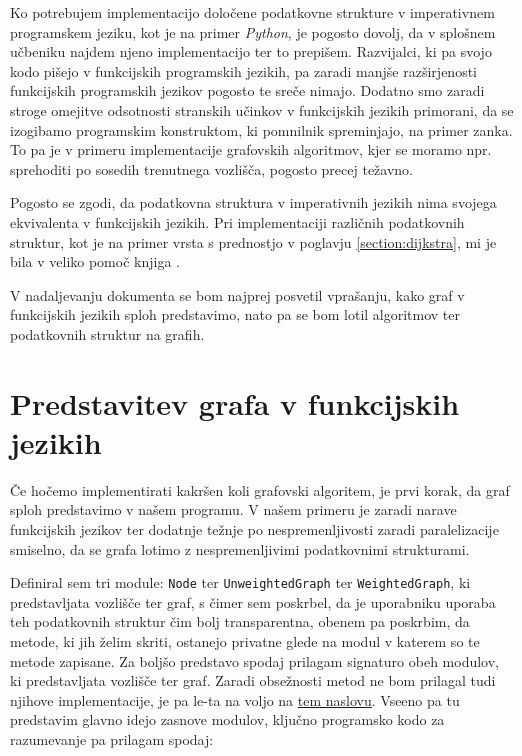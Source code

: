 \documentclass[mat1, tisk]{fmfdelo}
\begin{document}
Ko potrebujem implementacijo določene podatkovne strukture v imperativnem programskem jeziku, kot je na primer
\textit{Python}, je pogosto dovolj, da v splošnem učbeniku najdem njeno implementacijo ter to prepišem.
Razvijalci, ki pa svojo kodo pišejo v funkcijskih programskih jezikih, pa zaradi manjše
razširjenosti funkcijskih programskih jezikov pogosto te sreče nimajo.
Dodatno smo zaradi stroge omejitve odsotnosti stranskih učinkov v funkcijskih jezikih primorani, da se izogibamo
programskim konstruktom, ki pomnilnik spreminjajo, na primer zanka. To pa je v primeru implementacije grafovskih
algoritmov, kjer se moramo npr. sprehoditi po sosedih trenutnega vozlišča, pogosto precej težavno.

Pogosto se zgodi, da podatkovna struktura v imperativnih jezikih nima svojega ekvivalenta v funkcijskih jezikih.
Pri implementaciji različnih podatkovnih struktur, kot je na primer vrsta s prednostjo v poglavju
\ref{section:dijkstra}, mi je bila v veliko pomoč knjiga \cite{okasaki1996}.

V nadaljevanju dokumenta se bom najprej posvetil vprašanju, kako graf v funkcijskih jezikih sploh predstavimo, 
nato pa se bom lotil algoritmov ter podatkovnih struktur na grafih.


\section{Predstavitev grafa v funkcijskih jezikih}

Če hočemo implementirati kakršen koli grafovski algoritem, je prvi korak, da graf sploh predstavimo v našem programu.
V našem primeru je zaradi narave funkcijskih jezikov ter dodatnje težnje po nespremenljivosti zaradi paralelizacije
smiselno, da se grafa lotimo z nespremenljivimi podatkovnimi strukturami.

Definiral sem tri module: \texttt{Node} ter \texttt{UnweightedGraph} ter \texttt{WeightedGraph}, ki predstavljata 
vozlišče ter graf, s čimer sem poskrbel, da je uporabniku uporaba teh podatkovnih struktur čim bolj transparentna, 
obenem pa poskrbim, da metode, ki jih želim skriti, ostanejo privatne glede na modul v katerem so te metode zapisane.
Za boljšo predstavo spodaj prilagam signaturo obeh modulov, ki predstavljata vozlišče ter graf. Zaradi obsežnosti metod
ne bom prilagal tudi njihove implementacije, je pa le-ta na voljo na 
\href{https://github.com/tjazerzen/parallelisation-of-graph-algorithms-in-functional-programming-languages/blob/master/playground/graph/graph.ml}{tem naslovu}.
Vseeno pa tu predstavim glavno idejo zasnove modulov, ključno programsko kodo za razumevanje pa prilagam spodaj:
\end{document}

